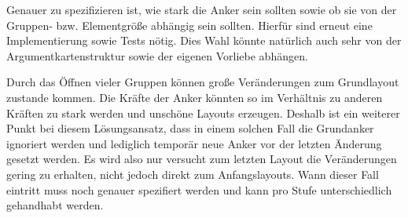 Genauer zu spezifizieren ist, wie stark die Anker sein sollten sowie ob sie von der Gruppen- bzw. Elementgröße abhängig sein sollten. 
Hierfür sind erneut eine Implementierung sowie Tests nötig. Dies Wahl könnte natürlich auch sehr von der Argumentkartenstruktur sowie der eigenen Vorliebe abhängen.

Durch das Öffnen vieler Gruppen können große Veränderungen zum Grundlayout zustande kommen.
Die Kräfte der Anker könnten so im Verhältnis zu anderen Kräften zu stark werden und unschöne Layouts erzeugen.
Deshalb ist ein weiterer Punkt bei diesem Lösungsansatz, dass in einem solchen Fall die Grundanker ignoriert werden 
und lediglich temporär neue Anker vor der letzten Änderung gesetzt werden. 
Es wird also nur versucht zum letzten Layout die Veränderungen gering zu erhalten, nicht jedoch direkt zum Anfangslayouts. 
Wann dieser Fall eintritt muss noch genauer spezifiert werden und kann pro Stufe unterschiedlich gehandhabt werden.

